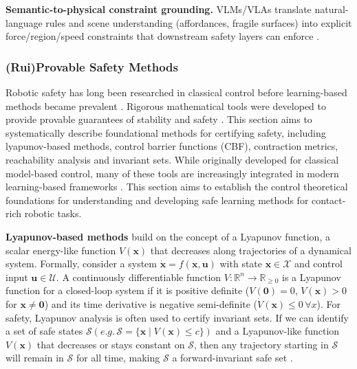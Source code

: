 \documentclass[Afour,sageh,times]{template/sagej}
\newcommand{\suggest}[1]{{\color{olive} (#1)}}
\begin{document}
\textbf{Semantic-to-physical constraint grounding.} VLMs/VLAs translate natural-language rules and scene understanding (affordances, fragile surfaces) into explicit force/region/speed constraints that downstream safety layers can enforce \citep{376}.

\subsubsection{\suggest{Rui}Provable Safety Methods}

Robotic safety has long been researched in classical control before learning-based methods became prevalent \citep{hogan1985impedance, khalil2002nonlinear, bansal2017hamilton, hogan2022contact}. Rigorous mathematical tools were developed to provide provable guarantees of stability and safety \citep{blanchini1999set, blanchini2008set, slotine1991applied, kumar_safe_2025}.  
This section aims to systematically describe foundational methods for certifying safety, including lyapunov-based methods, control barrier functions (CBF), contraction metrics, reachability analysis and invariant sets.
While originally developed for classical model-based control, many of these tools are increasingly integrated in modern learning-based frameworks \citep{wabersich2023data, 35, 75, 14, 57, 80}. This section aims to establish the control theoretical foundations for understanding and developing safe learning methods for contact-rich robotic tasks.

\textbf{Lyapunov-based methods} build on the concept of a Lyapunov function, a scalar energy-like function $V(\boldsymbol{x})$ that decreases along trajectories of a dynamical system. Formally, consider a system $\dot{\boldsymbol{x}}={f}(\boldsymbol{x}, \boldsymbol{u})$ with state $\boldsymbol{x} \in \mathcal{X}$ and control input $\boldsymbol{u} \in \mathcal{U}$. A continuously differentiable function $V: \mathbb{R}^{n} \to \mathbb{R}_{\ge 0}$ is a Lyapunov function for a closed-loop system if it is positive definite ($V(\boldsymbol{0}) =0$, $V(\boldsymbol{x}) > 0$ for $\boldsymbol{x} \neq \boldsymbol{0}$) and its time derivative is negative semi-definite ($\dot{V}(\boldsymbol{x}) \le 0 \, \forall x$).  For safety, Lyapunov analysis is often used to certify invariant sets. If we can identify a set of safe states $\mathcal{S} (e.g. \, \mathcal{S} = \{\boldsymbol{x}\mid V(\boldsymbol{x}) \le c\})$ and a Lyapunov-like function $V(\boldsymbol{x})$ that decreases or stays constant on $\mathcal{S}$, then any trajectory starting in $\mathcal{S}$ will remain in $\mathcal{S}$ for all time, making $\mathcal{S}$ a forward-invariant safe set \citep{khalil2002nonlinear}.
\end{document}
